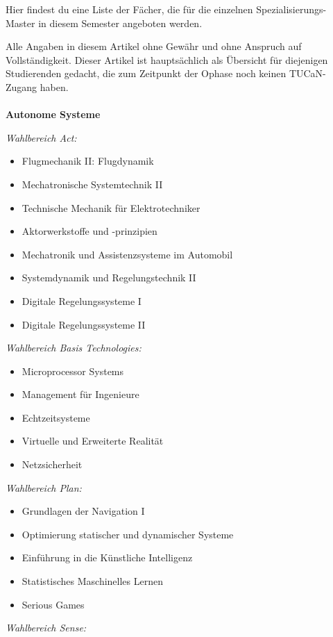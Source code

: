{Hier findest du eine Liste der Fächer, die für die einzelnen Spezialisierungs-Master in diesem Semester angeboten werden.}
{
    Alle Angaben in diesem Artikel ohne Gewähr und ohne Anspruch auf Vollständigkeit. Dieser Artikel ist hauptsächlich als Übersicht für diejenigen Studierenden gedacht, die zum Zeitpunkt der Ophase noch keinen TUCaN-Zugang haben.
    \\\\
    \textbf{Autonome Systeme}

    \textit{Wahlbereich Act:}
    \begin{itemize}[noitemsep]
        \item Flugmechanik II: Flugdynamik
        \item Mechatronische Systemtechnik II
        \item Technische Mechanik für Elektrotechniker
        \item Aktorwerkstoffe und -prinzipien
        \item Mechatronik und Assistenzsysteme im Automobil
        \item Systemdynamik und Regelungstechnik II
        \item Digitale Regelungssysteme I
        \item Digitale Regelungssysteme II
    \end{itemize}
    \textit{Wahlbereich Basis Technologies:}
    \begin{itemize}[noitemsep]
        \item Microprocessor Systems
        \item Management für Ingenieure
        \item Echtzeitsysteme
        \item Virtuelle und Erweiterte Realität
        \item Netzsicherheit
    \end{itemize}
    \textit{Wahlbereich Plan:}
    \begin{itemize}[noitemsep]
        \item Grundlagen der Navigation I
        \item Optimierung statischer und dynamischer Systeme
        \item Einführung in die Künstliche Intelligenz
        \item Statistisches Maschinelles Lernen
        \item Serious Games
    \end{itemize}
    \textit{Wahlbereich Sense:}
}
